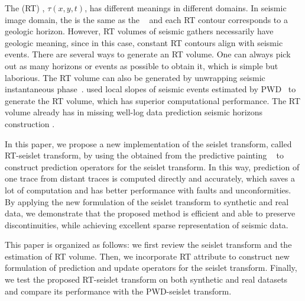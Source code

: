     The  (RT) , $\tau(x,y,t)$, has different meanings in
    different domains. 
    In seismic image domain, the  is the same as the 
    ~\cite[]{Stark2003, Stark2004} and each RT contour 
    corresponds to a geologic horizon.
    However, RT volumes of seismic gathers  necessarily have geologic 
    meaning, since in this case, constant RT contours align with seismic events.
    There are several ways to generate an RT volume. 
    One can always pick out as many horizons or events as possible to obtain it, 
    which is simple but laborious. 
    The RT volume can also be generated by unwrapping seismic instantaneous 
    phase~\cite[]{Stark2003, Wu2012}.
    \cite{Fomel2010b} used local slopes of seismic events estimated by 
    PWD~\cite[]{Fomel2002} to generate the RT volume, which has superior 
    computational performance. 
    The RT volume already has  in missing well-log 
    data prediction \cite[]{Bader2018} seismic horizons construction 
    \cite[]{Wu2015}.
    
    In this paper, we propose a new implementation of the seislet transform, 
    called RT-seislet transform, by using the  
    obtained from the predictive painting ~\cite[]{Fomel2010b} to construct 
    prediction operators for the seislet transform. 
    In this way, prediction of one trace from distant traces is computed 
    directly and accurately, which saves a lot of computation and has better 
    performance with faults and unconformities.
    By applying the new formulation of the seislet transform to synthetic and 
    real data, we demonstrate that the proposed method is efficient and able to 
    preserve discontinuities, while achieving excellent sparse representation of 
    seismic data. 

    This paper is organized as follows: we first review the seislet 
    transform and the estimation of  RT volume. 
    Then, we incorporate RT attribute to construct new formulation of prediction 
    and update operators for the seislet transform.
    Finally, we test the proposed RT-seislet transform on both synthetic and 
    real datasets and compare its performance with the PWD-seislet transform.
    
